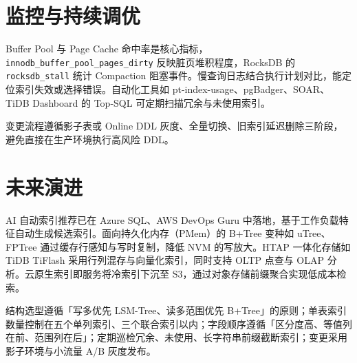 \chapter{监控与持续调优}
Buffer Pool 与 Page Cache 命中率是核心指标，\texttt{innodb\_{}buffer\_{}pool\_{}pages\_{}dirty} 反映脏页堆积程度，RocksDB 的 \texttt{rocksdb\_{}stall} 统计 Compaction 阻塞事件。慢查询日志结合执行计划对比，能定位索引失效或选择错误。自动化工具如 pt-index-usage、pgBadger、SOAR、TiDB Dashboard 的 Top-SQL 可定期扫描冗余与未使用索引。\par
变更流程遵循影子表或 Online DDL 灰度、全量切换、旧索引延迟删除三阶段，避免直接在生产环境执行高风险 DDL。\par
\chapter{未来演进}
AI 自动索引推荐已在 Azure SQL、AWS DevOps Guru 中落地，基于工作负载特征自动生成候选索引。面向持久化内存（PMem）的 B+Tree 变种如 uTree、FPTree 通过缓存行感知与写时复制，降低 NVM 的写放大。HTAP 一体化存储如 TiDB TiFlash 采用行列混存与向量化索引，同时支持 OLTP 点查与 OLAP 分析。云原生索引即服务将冷索引下沉至 S3，通过对象存储前缀聚合实现低成本检索。\par
结构选型遵循「写多优先 LSM-Tree、读多范围优先 B+Tree」的原则；单表索引数量控制在五个单列索引、三个联合索引以内；字段顺序遵循「区分度高、等值列在前、范围列在后」；定期巡检冗余、未使用、长字符串前缀截断索引；变更采用影子环境与小流量 A/B 灰度发布。\par

